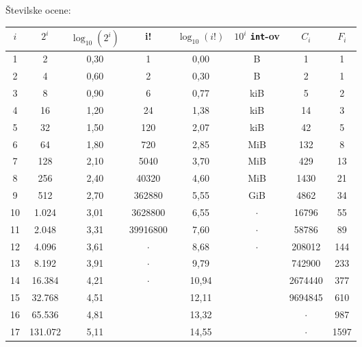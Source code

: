 \documentclass[a4paper,oneside,12pt]{article}
\newenvironment{description*}%
{
\begin{description}
\setlength{\itemsep}{0pt}
\setlength{\parskip}{2pt}
}
{\end{description}}
\begin{document}
\begin{description*}
  \item[Številske ocene:] \mbox{} \\[12pt]
    \hspace*{-20pt}
    \begin{tabular}[h]{|c|c|c|c|c|c|c|c|} \hline
      $i$ & $2^i$ & $\log_{10}(2^i)$ & i! & $\log_{10}(i!)$ & $10^i$ \texttt{int}-ov & $C_i$ & $F_i$ \\ \hline
        1 &             2 & 0,30 & 1        &  0,00 & \unit[40]{B}    & 1       & 1 \\
        2 &             4 & 0,60 & 2        &  0,30 & \unit[400]{B}   & 2       & 1 \\
        3 &             8 & 0,90 & 6        &  0,77 & \unit[3,9]{kiB} & 5       & 2 \\
        4 &            16 & 1,20 & 24       &  1,38 & \unit[39]{kiB}  & 14      & 3 \\
        5 &            32 & 1,50 & 120      &  2,07 & \unit[400]{kiB} & 42      & 5 \\
        6 &            64 & 1,80 & 720      &  2,85 & \unit[3,8]{MiB} & 132     & 8 \\
        7 &           128 & 2,10 & 5040     &  3,70 & \unit[38]{MiB}  & 429     & 13 \\
        8 &           256 & 2,40 & 40320    &  4,60 & \unit[380]{MiB} & 1430    & 21 \\
        9 &           512 & 2,70 & 362880   &  5,55 & \unit[3,7]{GiB} & 4862    & 34 \\
       10 &         1.024 & 3,01 & 3628800  &  6,55 & $\cdot$         & 16796   & 55 \\
       11 &         2.048 & 3,31 & 39916800 &  7,60 & $\cdot$         & 58786   & 89 \\
       12 &         4.096 & 3,61 & $\cdot$  &  8,68 & $\cdot$         & 208012  & 144 \\
       13 &         8.192 & 3,91 & $\cdot$  &  9,79 &                 & 742900  & 233 \\
       14 &        16.384 & 4,21 & $\cdot$  & 10,94 &                 & 2674440 & 377 \\
       15 &        32.768 & 4,51 &          & 12,11 &                 & 9694845 & 610 \\
       16 &        65.536 & 4,81 &          & 13,32 &                 & $\cdot$ & 987 \\
       17 &       131.072 & 5,11 &          & 14,55 &                 & $\cdot$ & 1597 \\

\end{tabular}
\end{description*}
\end{document}
